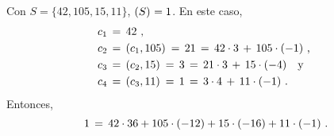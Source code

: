 
\begin{ejemLineales}\label{ejem:lineales:bezout}
	Con $S=\{42,105,15,11\}$, $\left({S}\right)_{}=1$.
	En este caso,
	\begin{displaymath}
		\begin{aligned}
			c_1 & \,=\, 42 \text{ ,} \\
			c_2 & \,=\,\left({c_1,105}\right)_{}\,=\,21
				\,=\,42\cdot 3\,+\,105\cdot (-1) \text{ ,} \\
			c_3 & \,=\,\left({c_2,15}\right)_{}\,=\,3
				\,=\,21\cdot 3\,+\,15\cdot (-4) \quad\text{y}\quad \\
			c_4 & \,=\,\left({c_3,11}\right)_{}\,=\,1
				\,=\,3\cdot 4\,+\,11\cdot (-1) \text{ .}
		\end{aligned}
	\end{displaymath}
	Entonces,
	\begin{displaymath}
		1\,=\,42\cdot 36+105\cdot(-12)+15\cdot (-16)+11\cdot(-1)
		\text{ .}
	\end{displaymath}
\end{ejemLineales}


